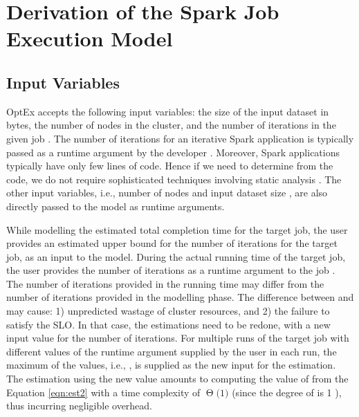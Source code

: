 \documentclass[conference]{IEEEtran}
\begin{document}
 \section{Derivation of the Spark Job Execution Model}\label{sec:model}












\subsection{Input Variables} \label{sec:var}
OptEx accepts the following input variables:
the size  of the input dataset in bytes, the number of nodes  in the cluster, and
   the number of iterations  in the given job \cite{Zaharia:2012:RDD:2228298.2228301}.
    The
number of iterations for an iterative Spark application is typically passed as a runtime argument by the developer
\cite{Zaharia:2012:RDD:2228298.2228301}. Moreover, Spark applications typically have only  few lines of code. Hence if we need to determine  from the code, we do not require sophisticated techniques involving static analysis \cite{Zuleger:2011:BAI:2041552.2041574}. The other input variables, i.e., number of nodes 
and input dataset size , are also directly
 passed to the model as runtime arguments.
 \par  While modelling the estimated total completion time for the target job, the user provides an
   estimated upper bound for the number of iterations  for the target job, as an input to the
   model. During the actual running time of the target job, the user provides the number of iterations
    as a
   runtime argument to the job \cite{Zaharia:2012:RDD:2228298.2228301}.
   The number of iterations  provided in the running time may differ from
    the number of iterations  provided in the modelling phase.  The difference between
    and  may cause: 1) unpredicted
  wastage of cluster resources, and 2) the failure to satisfy the SLO.
  \newcommand{\BigTheta}[1]{\ensuremath{\operatorname{\Theta}\bigl(#1\bigr)}}
In that case, the estimations need to be  redone, with a new input value for the number of iterations. For multiple runs of the target job with different values of the runtime argument
   supplied by the user in each run, the maximum of the 
  values, i.e., , is supplied as the new input for the estimation.
   The estimation using the new value  amounts to computing the value of  from
     the Equation \ref{eqn:est2} with a time complexity of \BigTheta{1} (since the degree of
      is 1 \cite{leader2004numerical}), thus incurring negligible overhead.
\end{document}
